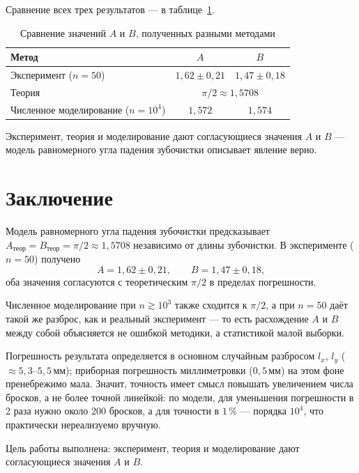 \documentclass[a4paper, 14pt]{extarticle}
\begin{document}
Сравнение всех трех результатов --- в таблице~\ref{tab:compare}.

\begin{table}[H]
  \centering
  \caption{Сравнение значений $A$ и $B$, полученных разными методами}
  \label{tab:compare}
  \begin{tabular}{|l|c|c|}
    \hline
    Метод & $A$ & $B$ \\
    \hline
    Эксперимент ($n=50$) & $1{,}62 \pm 0{,}21$ & $1{,}47 \pm 0{,}18$ \\
    \hline
    Теория & \multicolumn{2}{c|}{$\pi/2 \approx 1{,}5708$} \\
    \hline
    Численное моделирование ($n=10^4$) & $1{,}572$ & $1{,}574$ \\
    \hline
  \end{tabular}
\end{table}

Эксперимент, теория и моделирование дают согласующиеся значения $A$ и $B$ ---
модель равномерного угла падения зубочистки описывает явление верно.

\section*{Заключение}

Модель равномерного угла падения зубочистки предсказывает
$A_{\text{теор}} = B_{\text{теор}} = \pi/2 \approx 1{,}5708$ независимо от
длины зубочистки. В эксперименте ($n=50$) получено
\[
  A = 1{,}62 \pm 0{,}21, \qquad B = 1{,}47 \pm 0{,}18,
\]
оба значения согласуются с теоретическим $\pi/2$ в пределах погрешности.

Численное моделирование при $n \gtrsim 10^3$ также сходится к $\pi/2$, а при
$n=50$ даёт такой же разброс, как и реальный эксперимент --- то есть
расхождение $A$ и $B$ между собой объясняется не ошибкой методики, а
статистикой малой выборки.

Погрешность результата определяется в основном случайным разбросом
$l_x$, $l_y$ ($\approx5{,}3$--$5{,}5\,\text{мм}$); приборная погрешность
миллиметровки ($0{,}5\,\text{мм}$) на этом фоне пренебрежимо мала. Значит,
точность имеет смысл повышать увеличением числа бросков, а не более
точной линейкой: по модели, для уменьшения погрешности в 2 раза нужно
около 200 бросков, а для точности в $1\,\%$ --- порядка $10^4$, что
практически нереализуемо вручную.

Цель работы выполнена: эксперимент, теория и моделирование дают согласующиеся
значения $A$ и $B$.
\end{document}
